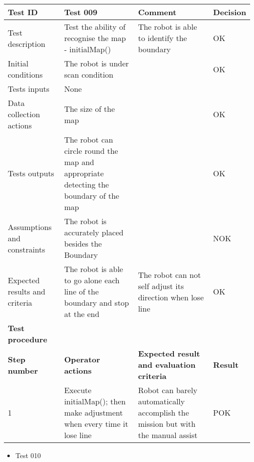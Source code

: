\documentclass[11pt, a4paper]{article}
\begin{document}
\begin{tabular} 
	  {|p{4cm}|p{4.5cm}|p{4.5cm}|p{1.5cm}|}
\hline
\textbf{Test ID} & \textbf{Test 009} & \textbf{Comment} & \textbf{Decision}\\
\hline
{Test description} & {Test the ability of recognise the map - initialMap()} & {The robot is able to identify the boundary} & {OK}\\
\hline
{Initial conditions} & {The robot is under scan \newline condition} & {} & {OK}\\
\hline
{Tests inputs} & {None} & {} & {}\\
\hline
{Data collection actions} & {The size of the map} & {} & {OK}\\
\hline
{Tests outputs} & {The robot can circle round the map and appropriate detecting the boundary of the map} & {} & {OK}\\
\hline
{Assumptions and constraints} & {The robot is accurately placed besides the Boundary} & {} & {NOK}\\
\hline
{Expected results and criteria} & {The robot is able to go alone each line of the boundary and stop at the end} & {The robot  can not self adjust its direction when lose line} & {OK}\\
\hline
\textbf{Test procedure} & \textbf{} & \textbf{} & \textbf{}\\
\hline
\textbf{Step number} & \textbf{Operator actions} & \textbf{Expected result and \newline evaluation criteria} & \textbf{Result}\\
\hline
{1} & {Execute \newline initialMap(); \newline then make adjustment when \newline every time it lose line} & {Robot can barely automatically accomplish the mission but with the manual assist} & {POK}\\
\hline
\end{tabular}
\newpage

\begin{itemize}
\item {Test 010}\\
\end{itemize}
\end{document}
